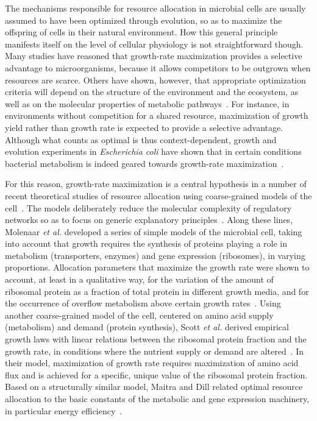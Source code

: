 The mechanisms responsible for resource allocation in microbial cells are usually assumed to have been optimized through evolution, so as to maximize the offspring of cells in their natural environment.
How this general principle manifests itself on the level of cellular physiology is not straightforward though.
Many studies have reasoned that growth-rate maximization provides a selective advantage to microorganisms, because it allows competitors to be outgrown when resources are scarce.
Others have shown, however, that appropriate optimization criteria will depend on the structure of the environment and the ecosystem, as well as on the molecular properties of metabolic pathways~\cite{frank_tradeoff_2010,maclean_tragedy_2008,schuetz_multidimensional_2012,schuster_maximization_2008,schuetz_systematic_2007}.
For instance,  in environments without competition for a shared resource, maximization of growth yield rather than growth rate is expected to provide a selective advantage.
Although what counts as optimal is thus context-dependent, growth and evolution experiments in \textit{Escherichia coli} have shown that in certain conditions bacterial metabolism is indeed geared towards growth-rate maximization~\cite{edwards_silico_2001,ibarra_escherichia_2002,lewis_omic_2010}.

For this reason, growth-rate maximization is a central hypothesis in a number of recent theoretical studies of resource allocation using coarse-grained models of the cell~\cite{molenaar_shifts_2009,scott_interdependence_2010,scott_emergence_2014}.
The models deliberately reduce the molecular complexity of regulatory networks so as to focus on generic explanatory principles~\cite{servedio_not_2014}.
Along these lines, Molenaar \textit{et al.} developed a series of simple models of the microbial cell, taking into account that growth requires the synthesis of proteins playing a role in metabolism (transporters, enzymes) and gene expression (ribosomes), in varying proportions.
Allocation parameters that maximize the growth rate were shown to account, at least in a qualitative way, for the variation of the amount of ribosomal protein as a fraction of total protein in different growth media, and for the occurrence of overflow metabolism above certain growth rates~\cite{molenaar_shifts_2009}.
Using another coarse-grained model of the cell, centered on amino acid supply (metabolism) and demand (protein synthesis), Scott \textit{et al.} derived empirical growth laws with linear relations between the ribosomal protein fraction and the growth rate, in conditions where the nutrient supply or demand are altered~\cite{scott_interdependence_2010,scott_emergence_2014}.
In their model, maximization of growth rate requires maximization of amino acid flux and is achieved for a specific, unique value of the ribosomal protein fraction.
Based on a structurally similar model, Maitra and Dill related optimal resource allocation to the basic constants of the metabolic and gene expression machinery, in particular energy efficiency~\cite{maitra_bacterial_2014}.

